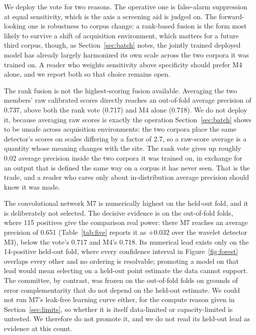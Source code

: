 \documentclass[11pt]{article}
\begin{document}
We deploy the vote for two reasons. The operative one is false-alarm suppression at equal sensitivity, which is the axis a screening aid is judged on. The forward-looking one is robustness to corpus change: a rank-based fusion is the form most likely to survive a shift of acquisition environment, which matters for a future third corpus, though, as Section~\ref{sec:batch} notes, the jointly trained deployed model has already largely harmonized its own scale across the two corpora it was trained on. A reader who weights sensitivity above specificity should prefer M4 alone, and we report both so that choice remains open.

The rank fusion is not the highest-scoring fusion available. Averaging the two members' raw calibrated scores directly reaches an out-of-fold average precision of 0.737, above both the rank vote (0.717) and M4 alone (0.718). We do not deploy it, because averaging raw scores is exactly the operation Section~\ref{sec:batch} shows to be unsafe across acquisition environments: the two corpora place the same detector's scores on scales differing by a factor of 2.7, so a raw-score average is a quantity whose meaning changes with the site. The rank vote gives up roughly 0.02 average precision inside the two corpora it was trained on, in exchange for an output that is defined the same way on a corpus it has never seen. That is the trade, and a reader who cares only about in-distribution average precision should know it was made.

The convolutional network M7 is numerically highest on the held-out fold, and it is deliberately not selected. The decisive evidence is on the out-of-fold folds, where 115 positives give the comparison real power: there M7 reaches an average precision of 0.651 (Table~\ref{tab:five} reports it as $+0.032$ over the wavelet detector M3), below the vote's 0.717 and M4's 0.718. Its numerical lead exists only on the 14-positive held-out fold, where every confidence interval in Figure~\ref{fig:forest} overlaps every other and no ordering is resolvable; promoting a model on that lead would mean selecting on a held-out point estimate the data cannot support. The committee, by contrast, was frozen on the out-of-fold folds on grounds of error complementarity that do not depend on the held-out estimate. We could not run M7's leak-free learning curve either, for the compute reason given in Section~\ref{sec:limits}, so whether it is itself data-limited or capacity-limited is untested. We therefore do not promote it, and we do not read its held-out lead as evidence at this count.
\end{document}

